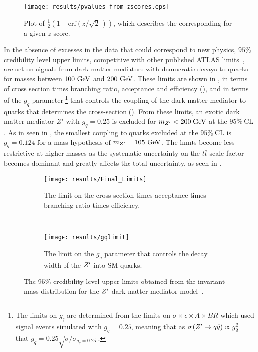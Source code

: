 \begin{figure}[htbp]
 \centering
 \texttt{[image: results/pvalues\_from\_zscores.eps]}
 \caption[Plot of \pvalue{} as a function of $z$-score.]{%
  Plot of $\frac{1}{2}\left(1 - \mathrm{erf}\left(z/\sqrt{2}\,\right)\right)$, which describes the corresponding \pvalue{} for a given $z$-score.}\label{fig:pvalues_from_zscores}
\end{figure}

In the absence of excesses in the data that could correspond to new physics, $95\%$ credibility level upper limits, competitive with other published ATLAS limits~\cite{EXOT-2017-32}, are set on signals from dark matter mediators with democratic decays to quarks for masses between $100~\mathrm{GeV}$ and $200~\mathrm{GeV}$.
These limits are shown in , in terms of cross section times branching ratio, acceptance and efficiency (), and in terms of the $g_{q}$ parameter%
\footnote{The limits on $g_{q}$ are determined from the limits on $\sigma \times \epsilon \times A \times BR$ which used signal events simulated with $g_{q} = 0.25$, meaning that as $\sigma\left(Z' \to q\bar{q}\right) \propto g_{q}^{2}$ that $g_{q} = 0.25 \sqrt{\sigma/\sigma_{g_{q} = 0.25}}$\,.}
that controls the coupling of the \gls{dark matter mediator} to quarks that determines the cross-section ().
From these limits, an exotic dark matter mediator $\Zprime$ with $g_{q}=0.25$ is excluded for $m_{Z'} < 200~\mathrm{GeV}$ at the $95\%~\mathrm{CL}$.
As in seen in , the smallest coupling to quarks excluded at the $95\%~\mathrm{CL}$ is $g_{q} = 0.124$ for a mass hypothesis of $m_{Z'} = 105~\mathrm{GeV}$.
The limits become less restrictive at higher masses as the systematic uncertainty on the $t\bar{t}$ scale factor becomes dominant and greatly affects the total uncertainty, as seen in .

\begin{figure}[htbp]
 \centering
 \begin{subfigure}[t]{0.5\textwidth}
  \centering
  \texttt{[image: results/Final\_Limits]}
  \caption{The limit on the cross-section times acceptance times branching ratio times efficiency.}
  \label{fig:cross_section_limits}
 \end{subfigure}%
 ~
 \begin{subfigure}[t]{0.5\textwidth}
  \centering
  \texttt{[image: results/gqlimit]}
  \caption{The limit on the $g_{q}$ parameter that controls the decay width of the $\Zprime$ into SM quarks.}
  \label{fig:gq_limits}
 \end{subfigure}
 \caption[The $95\%$ credibility level upper limits obtained from the invariant mass distribution for the $\Zprime$ dark matter mediator model.]{%
  The $95\%$ credibility level upper limits obtained from the invariant mass distribution for the $\Zprime$ dark matter mediator model~\cite{ATLAS-CONF-2018-052}.}
 \label{fig:Zprime_limits}
\end{figure}

